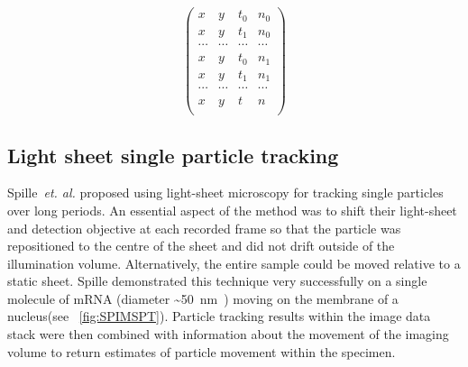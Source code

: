 \begin{figure}
\begin{subfigure}[t]{0.45\linewidth}
\begin{equation}
                \begin{pmatrix}
              x & y & t_0 & n_0\\
              x & y & t_1 & n_0 \\
              \cdots & \cdots & \cdots & \cdots \\
              x & y & t_0 & n_1 \\
              x & y & t_1 & n_1 \\
              \cdots & \cdots & \cdots & \cdots \\
              x & y & t & n \\
          \end{pmatrix}\label{eq:xytn_detection}
        \end{equation}
    \end{subfigure}
\end{figure}

\subsection{Light sheet single particle tracking}

Spille~\emph{et. al.} proposed using \gls{light-sheet} microscopy for tracking single particles over long periods.
An essential aspect of the method was to shift their \gls{light-sheet}
and detection objective at each recorded frame so that the particle was repositioned to the centre of the sheet and did not drift outside of the illumination volume.
Alternatively, the entire sample could be moved relative to a static sheet.
Spille demonstrated this technique very successfully on a single molecule of mRNA (diameter \SI{~50}{\nano\metre}~\cite{spille_direct_2015}) moving on the membrane of a nucleus(see \figurename~\ref{fig:SPIMSPT}).
Particle tracking results within the image data stack were then combined with information about the movement of the imaging volume to return estimates of particle movement within the specimen.

